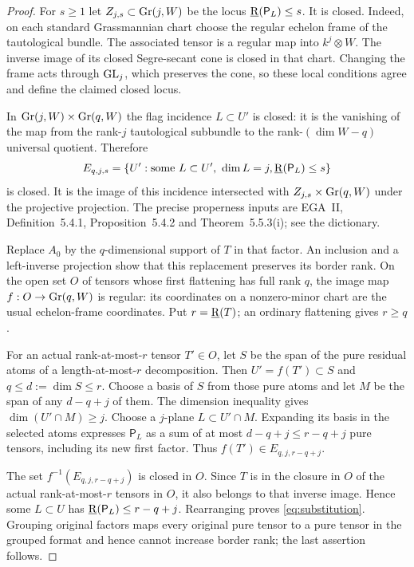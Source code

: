 \begin{proof}
For $s\geq1$ let $Z_{j,s}\subset\operatorname{Gr}(j,W)$ be the locus
$\underline{\mathrm R}(\mathsf P_L)\leq s$. It is closed. Indeed, on each
standard Grassmannian chart choose the regular echelon frame of
the tautological bundle. The associated tensor is a regular
map into $k^j\otimes W$. The inverse image of its closed
Segre-secant cone is closed in that chart. Changing the frame
acts through $\mathrm{GL}_j$, which preserves the cone, so these local
conditions agree and define the claimed closed locus.

In $\operatorname{Gr}(j,W)\times\operatorname{Gr}(q,W)$ the flag incidence $L\subset U'$
is closed: it is the vanishing of the map from the rank-$j$
tautological subbundle to the rank-$(\dim W-q)$ universal
quotient. Therefore
\[
 E_{q,j,s}=\{U':\text{some }L\subset U',\ \dim L=j,
                         \underline{\mathrm R}(\mathsf P_L)\leq s\}
\]
is closed. It is the image of this incidence intersected with
$Z_{j,s}\times\operatorname{Gr}(q,W)$ under the projective projection.
The precise properness inputs are EGA~II, Definition~5.4.1,
Proposition~5.4.2 and Theorem~5.5.3(i); see the dictionary.

Replace $A_0$ by the $q$-dimensional support of $T$ in that
factor. An inclusion and a left-inverse projection show that
this replacement preserves its border rank. On the open set
$O$ of tensors whose first flattening has full rank $q$, the
image map $f:O\to\operatorname{Gr}(q,W)$ is regular: its coordinates on
a nonzero-minor chart are the usual echelon-frame coordinates.
Put $r=\underline{\mathrm R}(T)$; an ordinary flattening gives $r\geq q$.

For an actual rank-at-most-$r$ tensor $T'\in O$, let $S$ be
the span of the pure residual atoms of a length-at-most-$r$
decomposition. Then $U'=f(T')\subset S$ and
$q\leq d:=\dim S\leq r$. Choose a basis of $S$ from those
pure atoms and let $M$ be the span of any $d-q+j$ of them.
The dimension inequality gives $\dim(U'\cap M)\geq j$.
Choose a $j$-plane $L\subset U'\cap M$. Expanding its
basis in the selected atoms expresses $\mathsf P_L$ as a
sum of at most $d-q+j\leq r-q+j$ pure tensors, including
its new first factor. Thus $f(T')\in E_{q,j,r-q+j}$.

The set $f^{-1}(E_{q,j,r-q+j})$ is closed in $O$. Since
$T$ is in the closure in $O$ of the actual rank-at-most-$r$
tensors in $O$, it also belongs to that inverse image. Hence
some $L\subset U$ has $\underline{\mathrm R}(\mathsf P_L)\leq r-q+j$.
Rearranging proves \eqref{eq:substitution}. Grouping original
factors maps every original pure tensor to a pure tensor in
the grouped format and hence cannot increase border rank;
the last assertion follows.
\end{proof}

